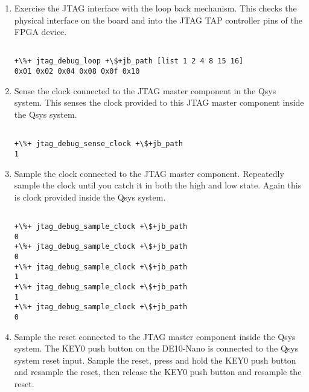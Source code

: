 \begin{flushleft}
\begin{enumerate}[
	label=\textbf{Step \arabic*.},
	leftmargin=*,
	widest={00},
	align=left]
\begin{enumerate}[
	label=\textbf{Step \arabic{enumi}\alph*.},
	leftmargin=*,
	align=left]
\begin{verbatim}
+\%+ set jb_path [get_service_paths jtag_debug]
/devices/5CSEBA6(.|ES)|5CSEMA6|..@2#1-4#DE-SoC/(link)/JTAG/
alt_sld_fab_sldfabric.node_0/phy_0

\end{verbatim}

\item Exercise the JTAG interface with the loop back mechanism.  This checks the physical interface on the board and into the JTAG TAP controller pins of the FPGA device.

\begin{verbatim}

+\%+ jtag_debug_loop +\$+jb_path [list 1 2 4 8 15 16]
0x01 0x02 0x04 0x08 0x0f 0x10

\end{verbatim}

\item Sense the clock connected to the JTAG master component in the Qsys system.  This senses the clock provided to this JTAG master component inside the Qsys system.

\begin{verbatim}

+\%+ jtag_debug_sense_clock +\$+jb_path
1

\end{verbatim}

\item Sample the clock connected to the JTAG master component.  Repeatedly sample the clock until you catch it in both the high and low state.  Again this is clock provided inside the Qsys system.

\begin{verbatim}

+\%+ jtag_debug_sample_clock +\$+jb_path
0
+\%+ jtag_debug_sample_clock +\$+jb_path
0
+\%+ jtag_debug_sample_clock +\$+jb_path
1
+\%+ jtag_debug_sample_clock +\$+jb_path
1
+\%+ jtag_debug_sample_clock +\$+jb_path
0

\end{verbatim}

\item Sample the reset connected to the JTAG master component inside the Qsys system.  The KEY0 push button on the DE10-Nano is connected to the Qsys system reset input.  Sample the reset, press and hold the KEY0 push button and resample the reset, then release the KEY0 push button and resample the reset.


\end{enumerate}
\end{enumerate}
\end{flushleft}
